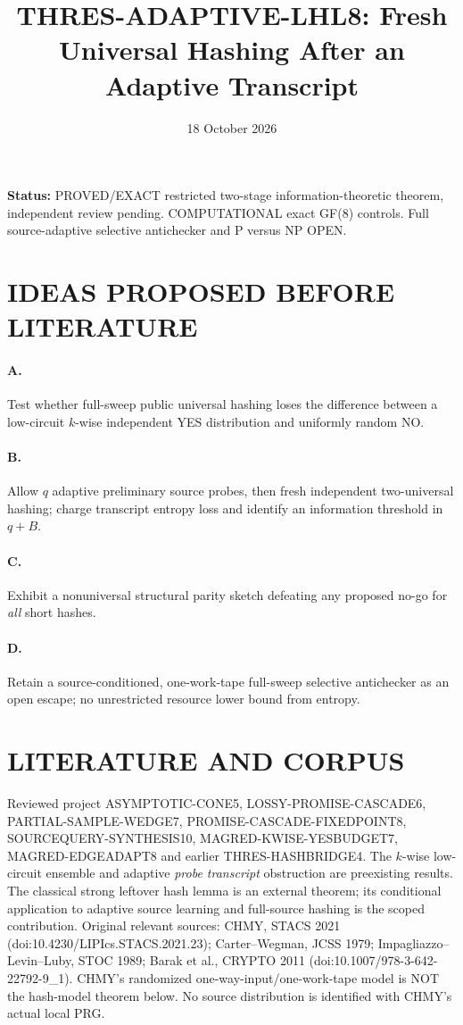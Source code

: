 \documentclass[11pt]{article}
\title{THRES-ADAPTIVE-LHL8: Fresh Universal Hashing After an Adaptive Transcript}
\date{18 October 2026}
\begin{document}
\maketitle
\noindent\textbf{Status:} PROVED/EXACT restricted two-stage information-theoretic theorem, independent review pending. COMPUTATIONAL exact GF(8) controls. Full source-adaptive selective antichecker and P versus NP OPEN.
\section*{IDEAS PROPOSED BEFORE LITERATURE}
\paragraph{A.} Test whether full-sweep public universal hashing loses the difference between a low-circuit $k$-wise independent YES distribution and uniformly random NO.
\paragraph{B.} Allow $q$ adaptive preliminary source probes, then fresh independent two-universal hashing; charge transcript entropy loss and identify an information threshold in $q+B$.
\paragraph{C.} Exhibit a nonuniversal structural parity sketch defeating any proposed no-go for \emph{all} short hashes.
\paragraph{D.} Retain a source-conditioned, one-work-tape full-sweep selective antichecker as an open escape; no unrestricted resource lower bound from entropy.
\section*{LITERATURE AND CORPUS}
Reviewed project ASYMPTOTIC-CONE5, LOSSY-PROMISE-CASCADE6, PARTIAL-SAMPLE-WEDGE7, PROMISE-CASCADE-FIXEDPOINT8, SOURCEQUERY-SYNTHESIS10, MAGRED-KWISE-YESBUDGET7, MAGRED-EDGEADAPT8 and earlier THRES-HASHBRIDGE4. The $k$-wise low-circuit ensemble and adaptive \emph{probe transcript} obstruction are preexisting results. The classical strong leftover hash lemma is an external theorem; its conditional application to adaptive source learning and full-source hashing is the scoped contribution. Original relevant sources: CHMY, STACS 2021 (doi:10.4230/LIPIcs.STACS.2021.23); Carter--Wegman, JCSS 1979; Impagliazzo--Levin--Luby, STOC 1989; Barak et al., CRYPTO 2011 (doi:10.1007/978-3-642-22792-9_1). CHMY's randomized one-way-input/one-work-tape model is NOT the hash-model theorem below. No source distribution is identified with CHMY's actual local PRG.
\end{document}
